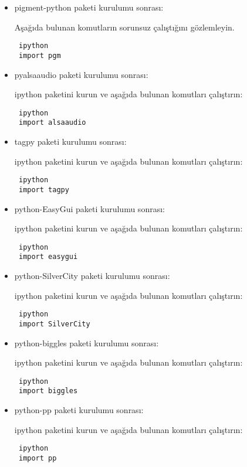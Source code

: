\documentclass[a4paper,10pt]{article}
\begin{document}
\begin{itemize}
\item pigment-python paketi kurulumu sonrası:

Aşağıda bulunan komutların sorunsuz çalıştığını gözlemleyin.

\begin{verbatim}
 ipython
 import pgm
\end{verbatim}

\item pyalsaaudio paketi kurulumu sonrası:

ipython paketini kurun ve aşağıda bulunan komutları çalıştırın:
\begin{verbatim}
 ipython
 import alsaaudio
\end{verbatim}

\item tagpy paketi kurulumu sonrası:

ipython paketini kurun ve aşağıda bulunan komutları çalıştırın:
\begin{verbatim}
 ipython
 import tagpy
\end{verbatim}

\item python-EasyGui paketi kurulumu sonrası:

ipython paketini kurun ve aşağıda bulunan komutları çalıştırın:
\begin{verbatim}
 ipython
 import easygui
\end{verbatim}

\item python-SilverCity paketi kurulumu sonrası:

ipython paketini kurun ve aşağıda bulunan komutları çalıştırın:
\begin{verbatim}
 ipython
 import SilverCity
\end{verbatim}

\item python-biggles paketi kurulumu sonrası:

ipython paketini kurun ve aşağıda bulunan komutları çalıştırın:
\begin{verbatim}
 ipython
 import biggles
\end{verbatim}

\item python-pp paketi kurulumu sonrası:

ipython paketini kurun ve aşağıda bulunan komutları çalıştırın:
\begin{verbatim}
 ipython
 import pp
\end{verbatim}


\end{itemize}
\end{document}
